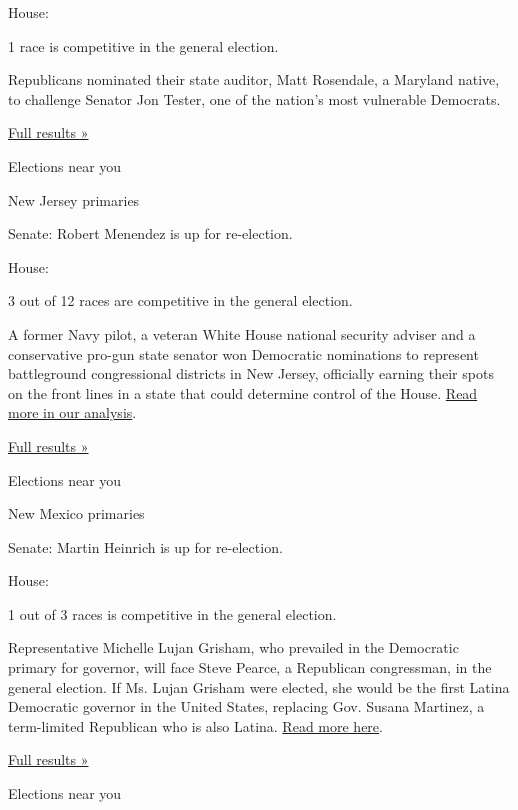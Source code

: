 House:

1 race is competitive in the general election.

Republicans nominated their state auditor, Matt Rosendale, a Maryland
native, to challenge Senator Jon Tester, one of the nation's most
vulnerable Democrats.

\href{https://www.nytimes3xbfgragh.onion/interactive/2018/06/05/us/elections/results-montana-primary-elections.html}{Full
results »}

Elections near you

New Jersey primaries

Senate: Robert Menendez is up for re-election.

House:

3 out of 12 races are competitive in the general election.

A former Navy pilot, a veteran White House national security adviser and
a conservative pro-gun state senator won Democratic nominations to
represent battleground congressional districts in New Jersey, officially
earning their spots on the front lines in a state that could determine
control of the House.
\href{https://www.nytimes3xbfgragh.onion/2018/06/05/us/politics/primary-elections-new-jersey.html}{Read
more in our analysis}.

\href{https://www.nytimes3xbfgragh.onion/interactive/2018/06/05/us/elections/results-new-jersey-primary-elections.html}{Full
results »}

Elections near you

New Mexico primaries

Senate: Martin Heinrich is up for re-election.

House:

1 out of 3 races is competitive in the general election.

Representative Michelle Lujan Grisham, who prevailed in the Democratic
primary for governor, will face Steve Pearce, a Republican congressman,
in the general election. If Ms. Lujan Grisham were elected, she would be
the first Latina Democratic governor in the United States, replacing
Gov. Susana Martinez, a term-limited Republican who is also Latina.
\href{https://www.nytimes3xbfgragh.onion/2018/06/05/us/politics/primary-elections-new-jersey.html}{Read
more here}.

\href{https://www.nytimes3xbfgragh.onion/interactive/2018/06/05/us/elections/results-new-mexico-primary-elections.html}{Full
results »}

Elections near you

